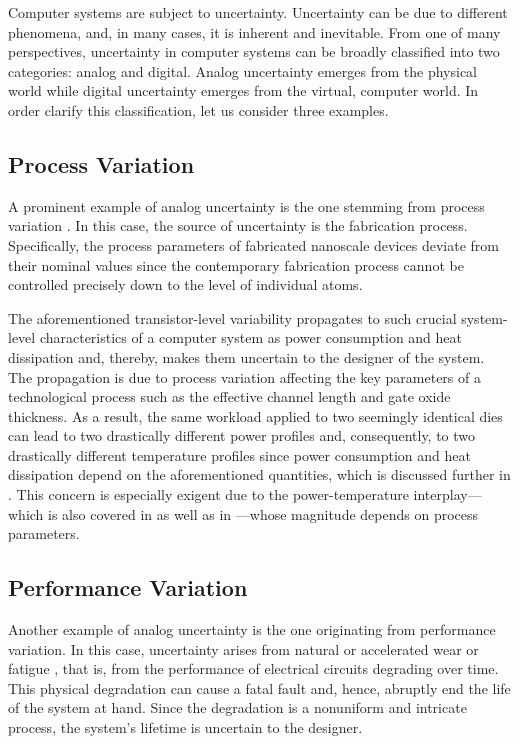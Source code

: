 Computer systems are subject to uncertainty. Uncertainty can be due to different
phenomena, and, in many cases, it is inherent and inevitable. From one of many
perspectives, uncertainty in computer systems can be broadly classified into two
categories: analog and digital. Analog uncertainty emerges from the physical
world while digital uncertainty emerges from the virtual, computer world. In
order clarify this classification, let us consider three examples.

\subsection{Process Variation}

A prominent example of analog uncertainty is the one stemming from process
variation \cite{chandrakasan2000, srivastava2010}. In this case, the source of
uncertainty is the fabrication process. Specifically, the process parameters of
fabricated nanoscale devices deviate from their nominal values since the
contemporary fabrication process cannot be controlled precisely down to the
level of individual atoms.

The aforementioned transistor-level variability propagates to such crucial
system-level characteristics of a computer system as power consumption and heat
dissipation and, thereby, makes them uncertain to the designer of the system.
The propagation is due to process variation affecting the key parameters of a
technological process such as the effective channel length and gate oxide
thickness. As a result, the same workload applied to two seemingly identical
dies can lead to two drastically different power profiles and, consequently, to
two drastically different temperature profiles since power consumption and heat
dissipation depend on the aforementioned quantities, which is discussed further
in . This concern is especially exigent due to the
power-temperature interplay---which is also covered in  as
well as in ---whose magnitude depends on
process parameters.

\subsection{Performance Variation}

Another example of analog uncertainty is the one originating from performance
variation. In this case, uncertainty arises from natural or accelerated wear or
fatigue \cite{jedec2016}, that is, from the performance of electrical circuits
degrading over time. This physical degradation can cause a fatal fault and,
hence, abruptly end the life of the system at hand. Since the degradation is a
nonuniform and intricate process, the system's lifetime is uncertain to the
designer.


